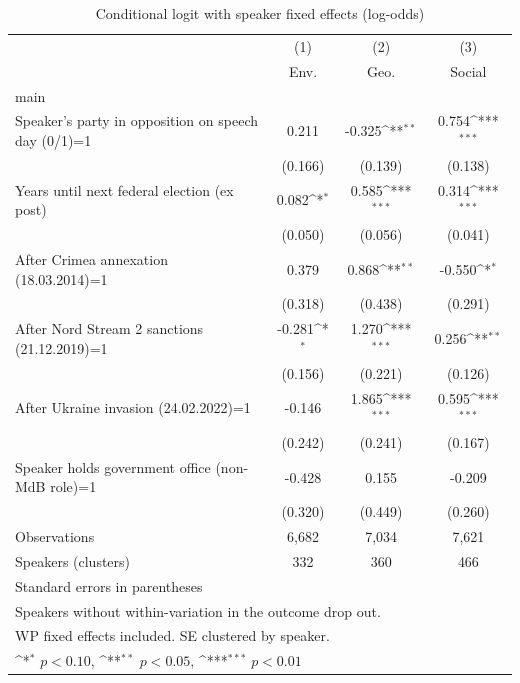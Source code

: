 \begin{table}[htbp]\centering
\def\sym#1{\ifmmode^{#1}\else\(^{#1}\)\fi}
\caption{Conditional logit with speaker fixed effects (log-odds)}
\begin{tabular}{l*{3}{c}}
\toprule
                    &\multicolumn{1}{c}{(1)}&\multicolumn{1}{c}{(2)}&\multicolumn{1}{c}{(3)}\\
                    &\multicolumn{1}{c}{Env.}&\multicolumn{1}{c}{Geo.}&\multicolumn{1}{c}{Social}\\
\midrule
main                &                     &                     &                     \\
Speaker's party in opposition on speech day (0/1)=1&       0.211         &      -0.325\sym{**} &       0.754\sym{***}\\
                    &     (0.166)         &     (0.139)         &     (0.138)         \\
\addlinespace
Years until next federal election (ex post)&       0.082\sym{*}  &       0.585\sym{***}&       0.314\sym{***}\\
                    &     (0.050)         &     (0.056)         &     (0.041)         \\
\addlinespace
After Crimea annexation (18.03.2014)=1&       0.379         &       0.868\sym{**} &      -0.550\sym{*}  \\
                    &     (0.318)         &     (0.438)         &     (0.291)         \\
\addlinespace
After Nord Stream 2 sanctions (21.12.2019)=1&      -0.281\sym{*}  &       1.270\sym{***}&       0.256\sym{**} \\
                    &     (0.156)         &     (0.221)         &     (0.126)         \\
\addlinespace
After Ukraine invasion (24.02.2022)=1&      -0.146         &       1.865\sym{***}&       0.595\sym{***}\\
                    &     (0.242)         &     (0.241)         &     (0.167)         \\
\addlinespace
Speaker holds government office (non-MdB role)=1&      -0.428         &       0.155         &      -0.209         \\
                    &     (0.320)         &     (0.449)         &     (0.260)         \\
\midrule
Observations        &       6,682         &       7,034         &       7,621         \\
Speakers (clusters) &         332         &         360         &         466         \\
\bottomrule
\multicolumn{4}{l}{\footnotesize Standard errors in parentheses}\\
\multicolumn{4}{l}{\footnotesize Speakers without within-variation in the outcome drop out.}\\
\multicolumn{4}{l}{\footnotesize WP fixed effects included. SE clustered by speaker.}\\
\multicolumn{4}{l}{\footnotesize \sym{*} \(p<0.10\), \sym{**} \(p<0.05\), \sym{***} \(p<0.01\)}\\
\end{tabular}
\end{table}
